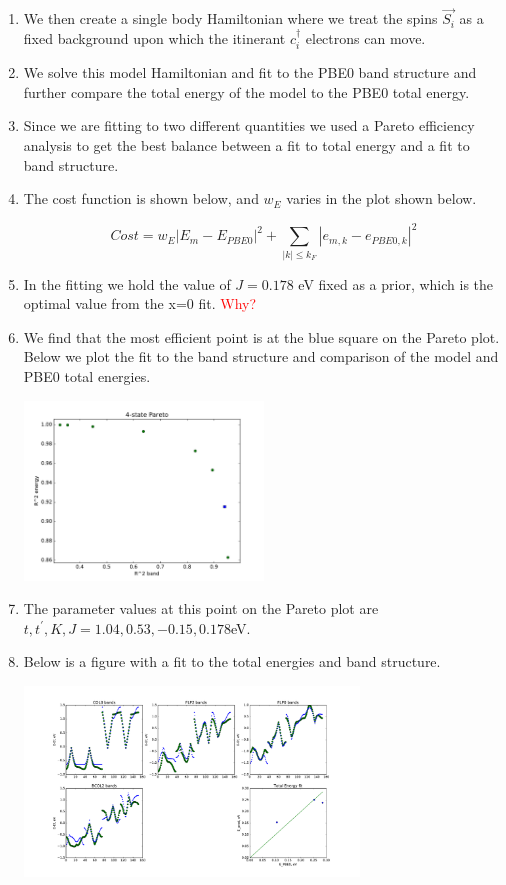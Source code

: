 \documentclass{article}
\begin{document}
\begin{enumerate}
\item We then create a single body  Hamiltonian where we treat the spins $\vec{S_i}$ as a fixed background upon which the itinerant $c_i^\dagger$ electrons can move. 

\item We solve this model Hamiltonian and fit to the PBE0 band structure and further compare the total energy of the model to the PBE0 total energy.

\item Since we are fitting to two different quantities we used a Pareto efficiency analysis to get the best balance between a fit to total energy and a fit to band structure. 

\item The cost function is shown below, and $w_E$ varies in the plot shown below.

$$Cost = w_E|E_m - E_{PBE0}|^2 + \sum_{|k|\le k_F} |e_{m,k} - e_{PBE0,k}|^2$$

\item In the fitting we hold the value of $J=0.178$ eV fixed as a prior, which is the optimal value from the x=0 fit. \textcolor{red}{Why?}
 
\item We find that the most efficient point is at the blue square on the Pareto plot. Below we plot the fit to the band structure and comparison of the model and PBE0 total energies. 

\includegraphics[width=0.5\textwidth]{../doped_fv/PBE0_8/tb_fit_0p25/pareto4.pdf}
\linebreak

\color{black}

\item The parameter values at this point on the Pareto plot are $t,t^\prime,K,J=  1.04, 0.53, -0.15, 0.178 $eV.

\item Below is a figure with a fit to the total energies and band structure.

\includegraphics[width=0.7\textwidth]{../doped_fv/PBE0_8/tb_fit_0p25/pareto4_low.pdf}
\end{enumerate}
\end{document}

